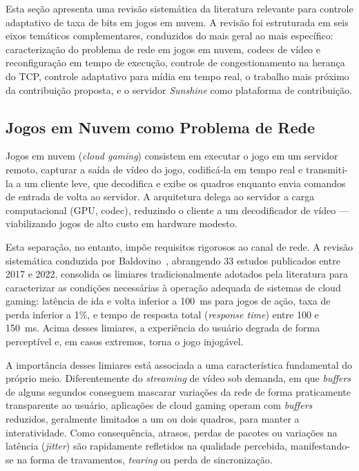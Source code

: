 \documentclass[conference]{IEEEtran}
\begin{document}
Esta seção apresenta uma revisão sistemática da literatura
relevante para controle adaptativo de taxa de bits em jogos em
nuvem. A revisão foi estruturada em seis eixos temáticos
complementares, conduzidos do mais geral ao mais específico:
caracterização do problema de rede em jogos em nuvem, codecs de
vídeo e reconfiguração em tempo de execução, controle de
congestionamento na herança do TCP, controle adaptativo para
mídia em tempo real, o trabalho mais próximo da contribuição
proposta, e o servidor \emph{Sunshine} como plataforma de
contribuição.

\subsection{Jogos em Nuvem como Problema de Rede}

Jogos em nuvem (\emph{cloud gaming}) consistem em executar o
jogo em um servidor remoto, capturar a saída de vídeo do jogo,
codificá-la em tempo real e transmiti-la a um cliente leve, que
decodifica e exibe os quadros enquanto envia comandos de entrada
de volta ao servidor. A arquitetura delega ao
servidor a carga computacional (GPU, codec), reduzindo o cliente
a um decodificador de vídeo — viabilizando jogos de alto custo
em hardware modesto.

Esta separação, no entanto, impõe requisitos rigorosos ao canal de rede. A revisão sistemática conduzida por Baldovino~\cite{baldovino2022}, abrangendo 33 estudos publicados entre 2017 e 2022, consolida os limiares tradicionalmente adotados pela literatura para caracterizar as condições necessárias à operação adequada de sistemas de cloud gaming: latência de ida e volta inferior
a \SI{100}{\milli\second} para jogos de ação, taxa de perda
inferior a 1\%, e tempo de resposta total (\emph{response time})
entre 100 e \SI{150}{\milli\second}. Acima desses limiares, a
experiência do usuário degrada de forma perceptível e, em casos
extremos, torna o jogo injogável.

A importância desses limiares está associada a uma característica fundamental do próprio meio. Diferentemente do \emph{streaming} de vídeo sob demanda, em que \emph{buffers} de alguns segundos conseguem mascarar variações da rede de forma praticamente transparente ao usuário, aplicações de cloud gaming operam com \emph{buffers} reduzidos, geralmente limitados a um ou dois quadros, para manter a interatividade. Como consequência, atrasos, perdas de pacotes ou variações na latência (\emph{jitter}) são rapidamente refletidos na qualidade percebida, manifestando-se na forma de travamentos, \emph{tearing} ou perda de sincronização.
\end{document}
